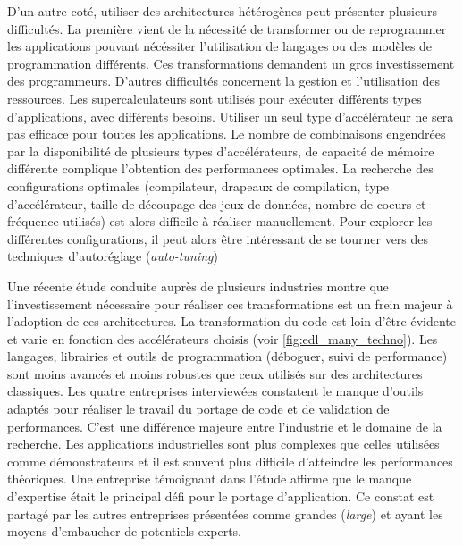         D'un autre coté, utiliser des architectures hétérogènes peut présenter plusieurs difficultés. La première vient de la nécessité de transformer ou de reprogrammer les applications pouvant nécéssiter l'utilisation de langages  ou des modèles de programmation différents. Ces transformations demandent un gros investissement des programmeurs. D'autres difficultés concernent la gestion et l'utilisation des ressources. Les supercalculateurs sont utilisés pour exécuter différents types d'applications, avec différents besoins. Utiliser un seul type d'accélérateur ne sera pas efficace pour toutes les applications. Le nombre de combinaisons engendrées par la disponibilité de plusieurs types d'accélérateurs, de capacité de mémoire différente complique l'obtention des performances optimales. La recherche des configurations optimales (compilateur, drapeaux de compilation, type d'accélérateur, taille de découpage des jeux de données, nombre de coeurs et fréquence utilisés) est alors difficile à réaliser manuellement. Pour explorer les différentes configurations, il peut alors être intéressant de se tourner vers des techniques d'autoréglage (\textit{auto-tuning}) \cite{datta2008stencil, hoste2008cole, mazouz2011performance, castro2015cere, popov:tel-01412638,  benkner_et_al:DR:2014:4423} 
        
        Une récente étude \cite{inproceedingsSCHC} conduite auprès de plusieurs industries montre que l'investissement nécessaire pour réaliser ces transformations est un frein majeur à l'adoption de ces architectures. La transformation du code est loin d'être évidente et varie en fonction des accélérateurs choisis (voir \autoref{fig:edl_many_techno}). Les langages, librairies et outils de programmation (déboguer, suivi de performance) sont moins avancés et moins robustes que ceux utilisés sur des architectures classiques. Les quatre entreprises interviewées \cite{inproceedingsSCHC} constatent le manque d'outils adaptés pour réaliser le travail du portage de code et de validation de performances. C'est une différence majeure entre l'industrie et le domaine de la recherche. Les applications industrielles sont plus complexes que celles utilisées comme démonstrateurs et il est souvent plus difficile d'atteindre les performances théoriques. Une entreprise témoignant dans l'étude \cite{inproceedingsSCHC} affirme que le manque d'expertise était le principal défi pour le portage d'application. Ce constat est partagé par les autres entreprises présentées comme grandes (\textit{large}) et ayant les moyens d'embaucher de potentiels experts.
        
